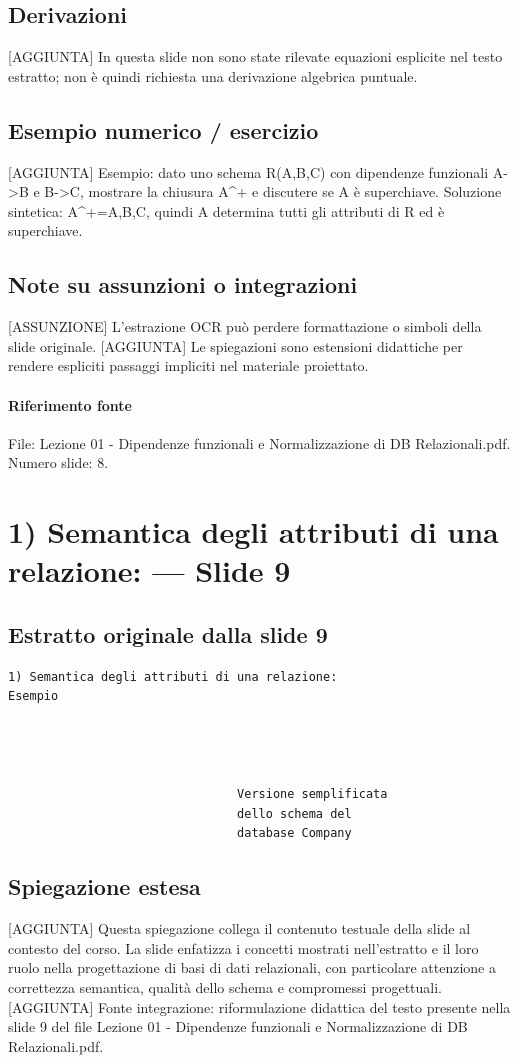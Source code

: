 \documentclass[11pt]{article}
\begin{document}
\subsection*{Derivazioni}
[AGGIUNTA] In questa slide non sono state rilevate equazioni esplicite nel testo estratto; non è quindi richiesta una derivazione algebrica puntuale.
\subsection*{Esempio numerico / esercizio}
[AGGIUNTA] Esempio: dato uno schema R(A,B,C) con dipendenze funzionali A->B e B->C, mostrare la chiusura A^+ e discutere se A è superchiave. Soluzione sintetica: A^+={A,B,C}, quindi A determina tutti gli attributi di R ed è superchiave.
\subsection*{Note su assunzioni o integrazioni}
[ASSUNZIONE] L'estrazione OCR può perdere formattazione o simboli della slide originale.
[AGGIUNTA] Le spiegazioni sono estensioni didattiche per rendere espliciti passaggi impliciti nel materiale proiettato.
\paragraph{Riferimento fonte} File: Lezione 01 - Dipendenze funzionali e Normalizzazione di DB Relazionali.pdf. Numero slide: 8.
\section{1) Semantica degli attributi di una relazione: --- Slide 9}
\subsection*{Estratto originale dalla slide 9}
\begin{lstlisting}
1) Semantica degli attributi di una relazione:
Esempio




                                Versione semplificata
                                dello schema del
                                database Company
\end{lstlisting}
\subsection*{Spiegazione estesa}
[AGGIUNTA] Questa spiegazione collega il contenuto testuale della slide al contesto del corso. La slide enfatizza i concetti mostrati nell'estratto e il loro ruolo nella progettazione di basi di dati relazionali, con particolare attenzione a correttezza semantica, qualità dello schema e compromessi progettuali.
[AGGIUNTA] Fonte integrazione: riformulazione didattica del testo presente nella slide 9 del file Lezione 01 - Dipendenze funzionali e Normalizzazione di DB Relazionali.pdf.
\end{document}
